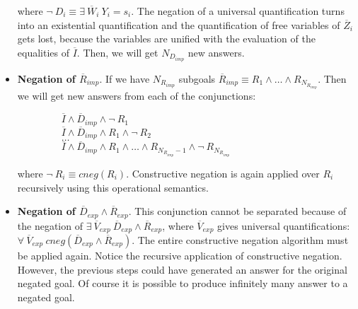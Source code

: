 \documentclass{tlp}
\begin{document}
\begin{itemize}
           where $ \neg~ D_i \equiv \exists~
           \overline{W}_i~ Y_i = s_i$. The negation of a universal
           quantification turns into an existential quantification and
           the quantification of free variables of $\overline{Z}_i$
           gets lost, because the variables are unified with the evaluation of
           the equalities of $\overline{I}$. Then, we will get
           $N_{D_{imp}}$ new answers.


           \item {\bf Negation of $\overline{R}_{imp}$}. If we have
           $N_{R_{imp}}$ subgoals $\overline{R}_{imp} \equiv R_1
           \wedge \ldots \wedge R_{N_{R_{imp}}}$. Then we will get
           new answers from each of the conjunctions: 

           $~~~~~~~~~~~~~~~~~~~~\overline{I} \wedge \overline{D}_{imp} \wedge \neg~ R_1 $ \\ 
           $~~~~~~~~~~~~~~~~~~~~\overline{I} \wedge \overline{D}_{imp} \wedge
           R_1 \wedge \neg~ R_2 $ \\ 
           $~~~~~~~~~~~~~~~~~~~~\ldots $ \\ 
           $~~~~~~~~~~~~~~~~~~~~\overline{I} \wedge \overline{D}_{imp} \wedge
           R_1 \wedge \ldots \wedge R_{N_{R_{imp}}-1} \wedge \neg~
           R_{N_{R_{imp}}}$ 

           where $ \neg~ R_i \equiv cneg(R_i)$. Constructive negation
           is again applied over $R_i$ recursively using this
           operational semantics.


           \item {\bf Negation of $\overline{D}_{exp} \wedge
           \overline{R}_{exp}$}. This conjunction cannot be separated
           because of the negation of $ \exists~ \overline{V}_{exp}~
           \overline{D}_{exp} \wedge \overline{R}_{exp}$, where
           $\overline{V}_{exp}$ gives universal quantifications:\\
           $\forall~ \overline{V}_{exp}~ cneg(\overline{D}_{exp}
           \wedge \overline{R}_{exp})$. The entire constructive
           negation algorithm must be applied again. Notice the
           recursive application of constructive negation. However,
           the previous steps could have generated an answer for the
           original negated goal. Of course it is possible to produce
           infinitely many answer to a negated goal.


\end{itemize}
\end{document}

